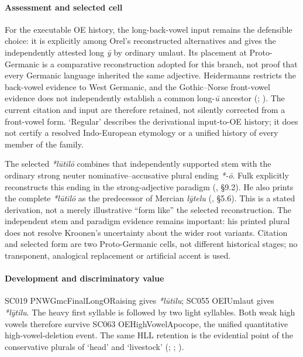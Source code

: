 \documentclass[
  british,
  a4paper,
]{article}
\providecommand{\Recon}[1]{\emph{*#1}}
\begin{document}
\paragraph{Assessment and selected
cell}\label{assessment-and-selected-cell}

For the executable OE history, the long-back-vowel input remains the
defensible choice: it is explicitly among Orel's reconstructed
alternatives and gives the independently attested long \emph{ȳ} by
ordinary umlaut. Its placement at Proto-Germanic is a comparative
reconstruction adopted for this branch, not proof that every Germanic
language inherited the same adjective. Heidermanns restricts the
back-vowel evidence to West Germanic, and the Gothic--Norse front-vowel
evidence does not independently establish a common long-\emph{ū}
ancestor (;
). The current
citation and input are therefore retained, not silently corrected from a
front-vowel form. `Regular' describes the derivational input-to-OE
history; it does not certify a resolved Indo-European etymology or a
unified history of every member of the family.

The selected \Recon{lūtilō} combines that independently supported stem
with the ordinary strong neuter nominative--accusative plural ending
\emph{*-ō}. Fulk explicitly reconstructs this ending in the
strong-adjective paradigm (,
§9.2). He also prints the complete \emph{*lūtilō} as the predecessor of
Mercian \emph{lȳtelu} (, §5.6).
This is a stated derivation, not a merely illustrative ``form like'' the
selected reconstruction. The independent stem and paradigm evidence
remains important: his printed plural does not resolve Kroonen's
uncertainty about the wider root variants. Citation and selected form
are two Proto-Germanic cells, not different historical stages; no
transponent, analogical replacement or artificial accent is used.

\paragraph{Development and discriminatory
value}\label{development-and-discriminatory-value}

SC019 PNWGmcFinalLongORaising gives \emph{*lūtilu}; SC055 OEIUmlaut
gives \emph{*lȳtilu}. The heavy first syllable is followed by two light
syllables. Both weak high vowels therefore survive SC063
OEHighVowelApocope, the unified quantitative high-vowel-deletion event.
The same HLL retention is the evidential point of the conservative
plurals of `head' and `livestock' (; ;
).
\end{document}
